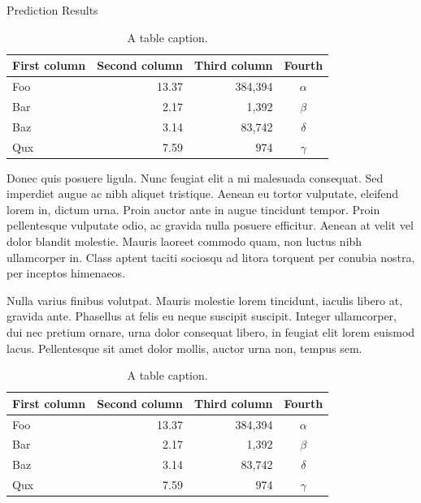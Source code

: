 \documentclass[final]{beamer}
\newlength{\colwidth}
\begin{document}
\begin{frame}[t]
\begin{columns}[t]
\begin{column}{\colwidth}
\begin{block}{Prediction Results}
    \begin{table}
      \centering
      \begin{tabular}{l r r c}
        \toprule
        \textbf{First column} & \textbf{Second column} & \textbf{Third column} & \textbf{Fourth} \\
        \midrule
        Foo & 13.37 & 384,394 & $\alpha$ \\
        Bar & 2.17 & 1,392 & $\beta$ \\
        Baz & 3.14 & 83,742 & $\delta$ \\
        Qux & 7.59 & 974 & $\gamma$ \\
        \bottomrule
      \end{tabular}
      \caption{A table caption.}
    \end{table}

    Donec quis posuere ligula. Nunc feugiat elit a mi malesuada consequat. Sed
    imperdiet augue ac nibh aliquet tristique. Aenean eu tortor vulputate,
    eleifend lorem in, dictum urna. Proin auctor ante in augue tincidunt
    tempor. Proin pellentesque vulputate odio, ac gravida nulla posuere
    efficitur. Aenean at velit vel dolor blandit molestie. Mauris laoreet
    commodo quam, non luctus nibh ullamcorper in. Class aptent taciti sociosqu
    ad litora torquent per conubia nostra, per inceptos himenaeos.

    Nulla varius finibus volutpat. Mauris molestie lorem tincidunt, iaculis
    libero at, gravida ante. Phasellus at felis eu neque suscipit suscipit.
    Integer ullamcorper, dui nec pretium ornare, urna dolor consequat libero,
    in feugiat elit lorem euismod lacus. Pellentesque sit amet dolor mollis,
    auctor urna non, tempus sem.
\begin{table}
      \centering
      \begin{tabular}{l r r c}
        \toprule
        \textbf{First column} & \textbf{Second column} & \textbf{Third column} & \textbf{Fourth} \\
        \midrule
        Foo & 13.37 & 384,394 & $\alpha$ \\
        Bar & 2.17 & 1,392 & $\beta$ \\
        Baz & 3.14 & 83,742 & $\delta$ \\
        Qux & 7.59 & 974 & $\gamma$ \\
        \bottomrule
      \end{tabular}
      \caption{A table caption.}
    \end{table}
  \end{block}


\end{column}
\end{columns}
\end{frame}
\end{document}
